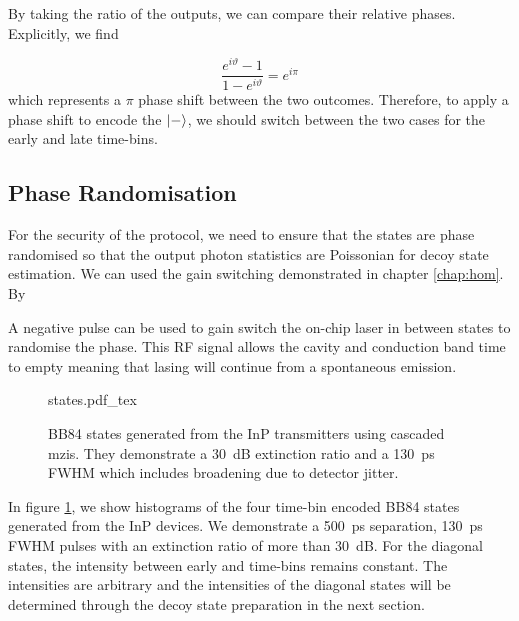 By taking the ratio of the outputs, we can compare their relative phases. Explicitly, we find

\begin{equation}
	\frac{e^{i\vartheta} -1}{1 - e^{i\vartheta}} = e^{i\pi}
\end{equation}
which represents a $\pi$ phase shift between the two outcomes. Therefore, to apply a phase shift to encode the $\ket{-}$, we should switch between the two cases for the early and late time-bins.


\subsection{Phase Randomisation}

For the security of the protocol, we need to ensure that the states are phase randomised so that the output photon statistics are Poissonian for decoy state estimation. We can used the gain switching demonstrated in chapter \ref{chap:hom}. By  

A negative pulse can be used to gain switch the on-chip laser in between states to randomise the phase. This RF signal allows the cavity and conduction band time to empty meaning that lasing will continue from a spontaneous emission.  

\begin{figure}[tbp]
	\centering
	\small
	\def\svgwidth{\textwidth} 
	{states.pdf_tex}
	\caption[BB84 states generated from the InP transmitters]{BB84 states generated from the \ac{InP} transmitters using cascaded \acp{mzi}. They demonstrate a \SI{30}{dB} extinction ratio and a \SI{130}{\ps} \ac{FWHM} which includes broadening due to detector jitter.}
	\label{fig:states}
\end{figure}

In figure \ref{fig:states}, we show histograms of the four time-bin encoded BB84 states generated from the \ac{InP} devices. We demonstrate a \SI{500}{ps} separation, \SI{130}{ps} \ac{FWHM} pulses with an extinction ratio of more than \SI{30}{dB}. For the diagonal states, the intensity between early and time-bins remains constant. The intensities are arbitrary and the intensities of the diagonal states will be determined through the decoy state preparation in the next section.

